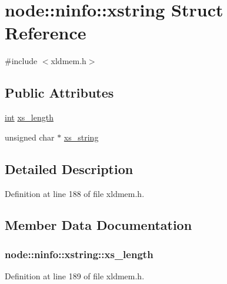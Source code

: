 \hypertarget{structnode_1_1ninfo_1_1xstring}{}\section{node\+:\+:ninfo\+:\+:xstring Struct Reference}
\label{structnode_1_1ninfo_1_1xstring}


{\ttfamily \#include $<$xldmem.\+h$>$}

\subsection*{Public Attributes}
\begin{DoxyCompactItemize}
\item 
\hyperlink{xmltok_8h_a5a0d4a5641ce434f1d23533f2b2e6653}{int} \hyperlink{structnode_1_1ninfo_1_1xstring_ae5ffd17715664a15ae5b4b0af1409673}{xs\+\_\+length}
\item 
unsigned char $\ast$ \hyperlink{structnode_1_1ninfo_1_1xstring_af25d1827c5a32e85c20b0efd06c46cee}{xs\+\_\+string}
\end{DoxyCompactItemize}


\subsection{Detailed Description}


Definition at line 188 of file xldmem.\+h.



\subsection{Member Data Documentation}
\subsubsection[{\texorpdfstring{xs\+\_\+length}{xs_length}}]{ node\+::ninfo\+::xstring\+::xs\+\_\+length}\hypertarget{structnode_1_1ninfo_1_1xstring_ae5ffd17715664a15ae5b4b0af1409673}{}\label{structnode_1_1ninfo_1_1xstring_ae5ffd17715664a15ae5b4b0af1409673}


Definition at line 189 of file xldmem.\+h.

